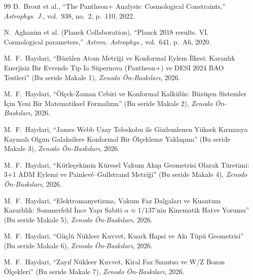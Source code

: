 \documentclass[11pt,a4paper]{article}
\begin{document}
\begin{thebibliography}{99}
    D.~Brout et al., ``The Pantheon+ Analysis: Cosmological Constraints,'' \textit{Astrophys. J.}, vol.~938, no.~2, p.~110, 2022.

    N.~Aghanim et al. (Planck Collaboration), ``Planck 2018 results. VI. Cosmological parameters,'' \textit{Astron. Astrophys.}, vol.~641, p.~A6, 2020.

    M.~F.~Haydari, ``Büzülen Atom Metriği ve Konformal Eylem İlkesi: Karanlık Enerjisiz Bir Evrende Tip Ia Süpernova (Pantheon+) ve DESI 2024 BAO Testleri'' (Bu seride Makale 1), \textit{Zenodo Ön-Baskıları}, 2026.

    M.~F.~Haydari, ``Ölçek-Zaman Cebiri ve Konformal Kalkülüs: Büzüşen Sistemler İçin Yeni Bir Matematiksel Formalizm'' (Bu seride Makale 2), \textit{Zenodo Ön-Baskıları}, 2026.

    M.~F.~Haydari, ``James Webb Uzay Teleskobu ile Gözlemlenen Yüksek Kırmızıya Kaymalı Olgun Galaksilere Konformal Bir Ölçekleme Yaklaşımı'' (Bu seride Makale 3), \textit{Zenodo Ön-Baskıları}, 2026.

    M.~F.~Haydari, ``Kütleçekimin Küresel Vakum Akışı Geometrisi Olarak Türetimi: 3+1 ADM Eylemi ve Painlevé--Gullstrand Metriği'' (Bu seride Makale 4), \textit{Zenodo Ön-Baskıları}, 2026.

    M.~F.~Haydari, ``Elektromanyetizma, Vakum Faz Dalgaları ve Kuantum Kararlılık: Sommerfeld İnce Yapı Sabiti $\alpha \approx 1/137$'nin Kinematik Hatve Yorumu'' (Bu seride Makale 5), \textit{Zenodo Ön-Baskıları}, 2026.

    M.~F.~Haydari, ``Güçlü Nükleer Kuvvet, Kuark Hapsi ve Akı Tüpü Geometrisi'' (Bu seride Makale 6), \textit{Zenodo Ön-Baskıları}, 2026.

    M.~F.~Haydari, ``Zayıf Nükleer Kuvvet, Kiral Faz Sızıntısı ve W/Z Bozon Ölçekleri'' (Bu seride Makale 7), \textit{Zenodo Ön-Baskıları}, 2026.
\end{thebibliography}
\end{document}
